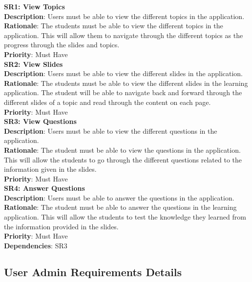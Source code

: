 \documentclass{l3proj}
\begin{document}
\textbf{SR1: View Topics}\\
\textbf{Description}: Users must be able to view the different topics in the application. \\
\textbf{Rationale}: The students must be able to view the different topics in the application. This will allow them to navigate through the different topics as the progress through the slides and topics.\\
\textbf{Priority}: Must Have \\


\textbf{SR2: View Slides}\\
\textbf{Description}: Users must be able to view the different slides in the application. \\
\textbf{Rationale}: The students must be able to view the different slides in the learning application. The student will be able to navigate back and forward through the different slides of a topic and read through the content on each page.  \\
\textbf{Priority}: Must Have\\


\textbf{SR3: View Questions}\\
\textbf{Description}: Users must be able to view the different questions in the application. \\
\textbf{Rationale}: The student must be able to view the questions in the application. This will allow the students to go through the different questions related to the information given in the slides.\\
\textbf{Priority}: Must Have\\


\textbf{SR4: Answer Questions}\\
\textbf{Description}: Users must be able to answer the questions in the application.\\
\textbf{Rationale}: The student must be able to answer the questions in the learning application. This will allow the students to test the knowledge they learned from the information provided in the slides. \\
\textbf{Priority}: Must Have\\
\textbf{Dependencies}: SR3\\


\subsection{User Admin Requirements Details}
\end{document}
